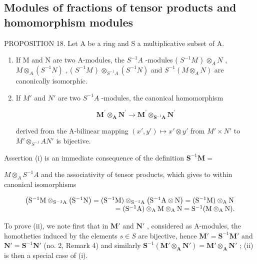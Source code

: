 \subsection{Modules of fractions of tensor products and homomorphism modules}

PROPOSITION 18. Let A be a ring and S a multiplicative subset of A.

\begin{enumerate}
\def\labelenumi{(\roman{enumi})}
\tightlist
\item
  If M and N are two A-modules, the \(S^{-1}A\) -modules ( \(S^{-1}M\) ) \(\otimes_{A}N\) , \(M\otimes_{A}(S^{-1}N)\) , ( \(S^{-1}M\) ) \(\otimes_{S^{-1}A}(S^{-1}N)\) and \(S^{-1}(M\otimes_{A}N)\) are canonically isomorphic.
\item
  If \(M'\) and \(N'\) are two \(S^{-1}A\) -modules, the canonical homomorphism

\[
\mathbf {M} ^ {\prime} \otimes_ {\mathbf {A}} \mathbf {N} ^ {\prime} \rightarrow \mathbf {M} ^ {\prime} \otimes_ {\mathbf {S} ^ {- 1} \mathbf {A}} \mathbf {N} ^ {\prime}
\]

derived from the A-bilinear mapping \((x', y') \mapsto x' \otimes y'\) from \(M' \times N'\) to \(M' \otimes_{S^{-1}} A N'\) is bijective.

\end{enumerate}
Assertion (i) is an immediate consequence of the definition \(\mathbf{S}^{-1}\mathbf{M} =\)

\(M \otimes_{A} S^{-1} A\) and the associativity of tensor products, which gives to within canonical isomorphisms

\[
\begin{array}{r l} \left(\mathrm{S} ^ {- 1} \mathrm{M} \otimes_ {\mathrm{S} ^ {- 1} \mathrm{A}} \left(\mathrm{S} ^ {- 1} \mathrm{N}\right) = (\mathrm{S} ^ {- 1} \mathrm{M}) \otimes_ {\mathrm{S} ^ {- 1} \mathrm{A}} \left(\mathrm{S} ^ {- 1} \mathrm{A} \otimes \mathrm{N}\right) = (\mathrm{S} ^ {- 1} \mathrm{M}) \otimes_ {\mathrm{A}} \mathrm{N} \right. \\ = (\mathrm{S} ^ {- 1} \mathrm{A}) \otimes_ {\mathrm{A}} \mathrm{M} \otimes_ {\mathrm{A}} \mathrm{N} = \mathrm{S} ^ {- 1} (\mathrm{M} \otimes_ {\mathrm{A}} \mathrm{N}). \end{array}
\]

To prove (ii), we note first that in \(\mathbf{M}'\) and \(\mathbf{N}'\) , considered as A-modules, the homotheties induced by the elements \(s \in S\) are bijective, hence \(\mathbf{M}' = \mathbf{S}^{-1}\mathbf{M}'\) and \(\mathbf{N}' = \mathbf{S}^{-1}\mathbf{N}'\) (no. 2, Remark 4) and similarly \(\mathbf{S}^{-1}(\mathbf{M}' \otimes_{\mathbf{A}} \mathbf{N}') = \mathbf{M}' \otimes_{\mathbf{A}} \mathbf{N}'\) ; (ii) is then a special case of (i).

